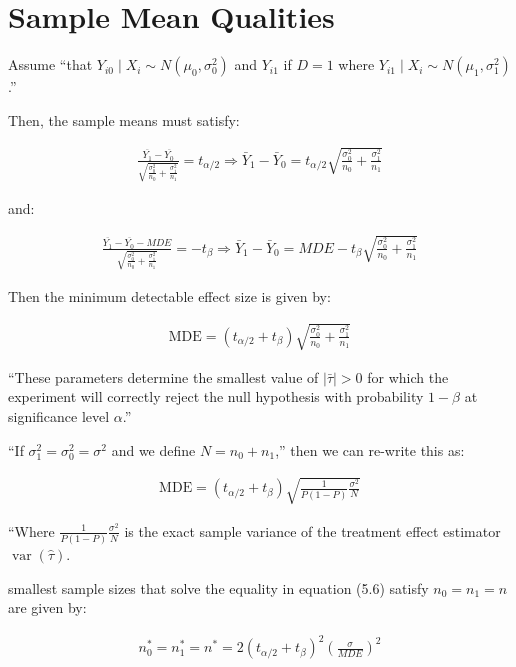 \documentclass[10pt]{article}
\begin{document}
\section{Sample Mean Qualities}

Assume ``that $Y_{i 0} \mid X_i \sim N\left(\mu_0, \sigma_0^2\right)$ 
and $Y_{i 1}$ if $D=1$ where $Y_{i 1} \mid X_i \sim N\left(\mu_1, \sigma_1^2\right)$.''

Then, the sample means 
must satisfy:

\begin{align}
    \frac{\overline{Y_1}-\overline{Y_0}}{\sqrt{\frac{\sigma_0^2}{n_0}+\frac{\sigma_1^2}{n_1}}}=t_{\alpha / 2} \Rightarrow \bar{Y}_1-\bar{Y}_0=t_{\alpha / 2} \sqrt{\frac{\sigma_0^2}{n_0}+\frac{\sigma_1^2}{n_1}}
\end{align}

and:

\begin{align}
    \frac{\overline{Y_1}-\overline{Y_0}-M D E}{\sqrt{\frac{\sigma_0^2}{n_0}+\frac{\sigma_1^2}{n_1}}}=-t_\beta \Rightarrow \bar{Y}_1-\bar{Y}_0=M D E-t_\beta \sqrt{\frac{\sigma_0^2}{n_0}+\frac{\sigma_1^2}{n_1}}
\end{align}

Then the minimum detectable effect size is given by:

\begin{align}
    \text{MDE}=\left(t_{\alpha / 2}+t_\beta\right) \sqrt{\frac{\sigma_0^2}{n_0}+\frac{\sigma_1^2}{n_1}}
\end{align}

``These parameters determine the smallest value of $|\bar{\tau}|>0$ for which the 
experiment will correctly reject the null hypothesis with probability 
$1-\beta$ at significance level $\alpha$.''

``If $\sigma_1^2=\sigma_0^2=\sigma^2$ and we define $N=n_0+n_1$,''
then we can re-write this as:

\begin{align}
    \text{MDE}=\left(t_{\alpha / 2}+t_\beta\right) \sqrt{\frac{1}{P(1-P)} \frac{\sigma^2}{N}}
\end{align}

``Where $\frac{1}{P(1-P)} \frac{\sigma^2}{N}$ is the exact sample variance of the treatment effect estimator $\operatorname{var}(\hat{\tau})$.

smallest sample sizes that solve the equality in equation (5.6) satisfy $n_0=n_1=n$ are given by:

\begin{align}
    n_0^*=n_1^*=n^*=2\left(t_{\alpha / 2}+t_\beta\right)^2\left(\frac{\sigma}{M D E}\right)^2
\end{align}
\end{document}
